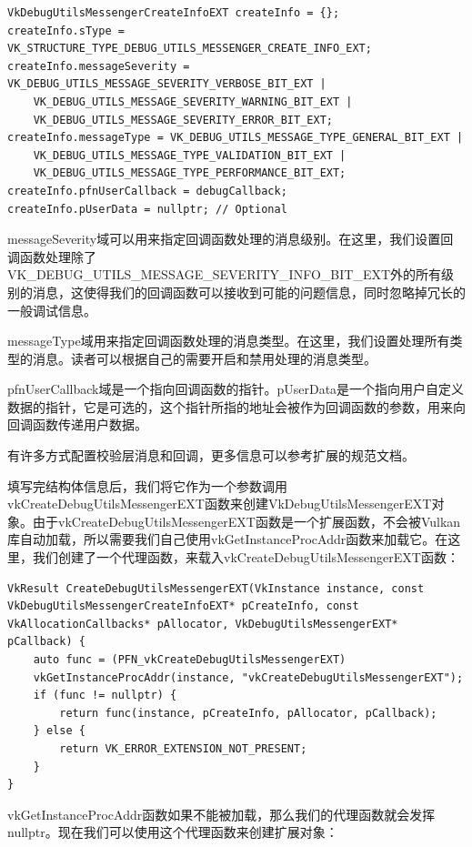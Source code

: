 \documentclass{ctexart}
\begin{document}
\begin{lstlisting}[language={[ANSI]C}]
VkDebugUtilsMessengerCreateInfoEXT createInfo = {};
createInfo.sType = VK_STRUCTURE_TYPE_DEBUG_UTILS_MESSENGER_CREATE_INFO_EXT;
createInfo.messageSeverity = VK_DEBUG_UTILS_MESSAGE_SEVERITY_VERBOSE_BIT_EXT |
	VK_DEBUG_UTILS_MESSAGE_SEVERITY_WARNING_BIT_EXT |
	VK_DEBUG_UTILS_MESSAGE_SEVERITY_ERROR_BIT_EXT;
createInfo.messageType = VK_DEBUG_UTILS_MESSAGE_TYPE_GENERAL_BIT_EXT |
	VK_DEBUG_UTILS_MESSAGE_TYPE_VALIDATION_BIT_EXT |
	VK_DEBUG_UTILS_MESSAGE_TYPE_PERFORMANCE_BIT_EXT;
createInfo.pfnUserCallback = debugCallback;
createInfo.pUserData = nullptr; // Optional
\end{lstlisting}

messageSeverity域可以用来指定回调函数处理的消息级别。在这里，我们设置回调函数处理除了VK\_DEBUG\_UTILS\_MESSAGE\_SEVERITY\_INFO\_BIT\_EXT外的所有级别的消息，这使得我们的回调函数可以接收到可能的问题信息，同时忽略掉冗长的一般调试信息。

messageType域用来指定回调函数处理的消息类型。在这里，我们设置处理所有类型的消息。读者可以根据自己的需要开启和禁用处理的消息类型。

pfnUserCallback域是一个指向回调函数的指针。pUserData是一个指向用户自定义数据的指针，它是可选的，这个指针所指的地址会被作为回调函数的参数，用来向回调函数传递用户数据。

有许多方式配置校验层消息和回调，更多信息可以参考扩展的规范文档。

填写完结构体信息后，我们将它作为一个参数调用vkCreateDebugUtilsMessengerEXT函数来创建VkDebugUtilsMessengerEXT对象。由于vkCreateDebugUtilsMessengerEXT函数是一个扩展函数，不会被Vulkan库自动加载，所以需要我们自己使用vkGetInstanceProcAddr函数来加载它。在这里，我们创建了一个代理函数，来载入vkCreateDebugUtilsMessengerEXT函数：

\begin{lstlisting}[language={[ANSI]C}]
VkResult CreateDebugUtilsMessengerEXT(VkInstance instance, const VkDebugUtilsMessengerCreateInfoEXT* pCreateInfo, const VkAllocationCallbacks* pAllocator, VkDebugUtilsMessengerEXT* pCallback) {
	auto func = (PFN_vkCreateDebugUtilsMessengerEXT)
	vkGetInstanceProcAddr(instance, "vkCreateDebugUtilsMessengerEXT");
	if (func != nullptr) {
		return func(instance, pCreateInfo, pAllocator, pCallback);
	} else {
		return VK_ERROR_EXTENSION_NOT_PRESENT;
	}
}
\end{lstlisting}

vkGetInstanceProcAddr函数如果不能被加载，那么我们的代理函数就会发挥nullptr。现在我们可以使用这个代理函数来创建扩展对象：
\end{document}
